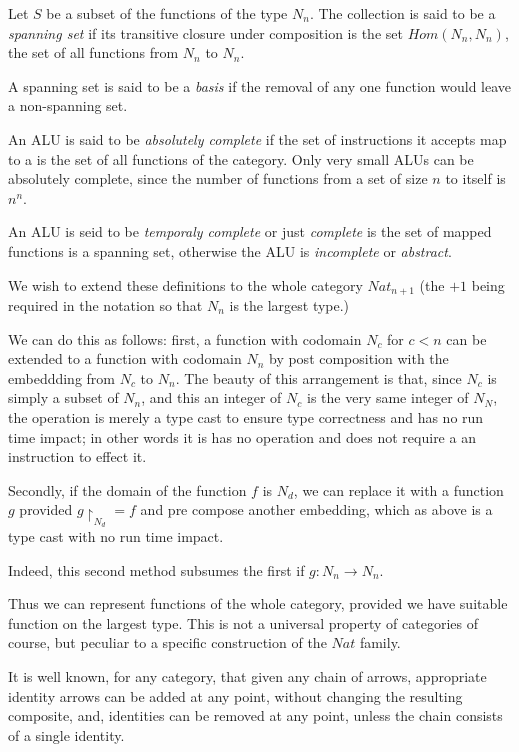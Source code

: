 \documentclass[oneside]{book}
\theoremstyle{plain}
\theoremstyle{definition}
\theoremstyle{plain}
\def\Nat{\mathit{Nat}}
\def\Hom{\mathit{Hom}}
\begin{document}
Let $S$ be a subset of the functions of the type $N_n$.
The collection is said to be a {\em spanning set} if its transitive 
closure under composition is the set $\Hom(N_n,N_n)$, the set of all functions
from $N_n$ to $N_n$.

A spanning set is said to be a {\em basis} if the removal
of any one function would leave a non-spanning set.

An ALU is said to be {\em absolutely complete} if the set of instructions
it accepts map to a is the set of all functions of the category.
Only very small ALUs can be absolutely complete, since the number of
functions from a set of size $n$ to itself is $n^n$.

An ALU is seid to be {\em temporaly complete} or just {\em complete}
is the set of mapped functions is a spanning set, otherwise the
ALU is {\em incomplete} or {\em abstract}.

We wish to extend these definitions to the whole category $\Nat_{n+1}$
(the $+1$ being required in the notation so that $N_n$ is the largest type.)

We can do this as follows: first, a function with codomain $N_c$ for $c<n$
can be extended to a function with codomain $N_n$ by post composition with
the embeddding from $N_c$ to $N_n$. The beauty of this arrangement is that,
since $N_c$ is simply a subset of $N_n$, and this an integer of $N_c$ is the
very same integer of $N_N$, the operation is merely a type cast to ensure
type correctness and has no run time impact; in other words it is has
no operation and does not require a an instruction to effect it.

Secondly, if the domain of the function $f$ is $N_d$, we can replace
it with a function $g$ provided $g\restriction_{N_d}=f$ and pre
compose another embedding, which as above is a type cast with no
run time impact.

Indeed, this second method subsumes the first if $g:N_n\rightarrow N_n$.

Thus we can represent functions of the whole category, 
provided we have suitable function on the largest type.
This is not a universal property of categories of course,
but peculiar to a specific construction of the $\Nat$ family.

It is well known, for any category, that given any chain of arrows,
appropriate identity arrows can be added at any point, without changing
the resulting composite, and, identities can be removed at any point,
unless the chain consists of a single identity.
\end{document}
